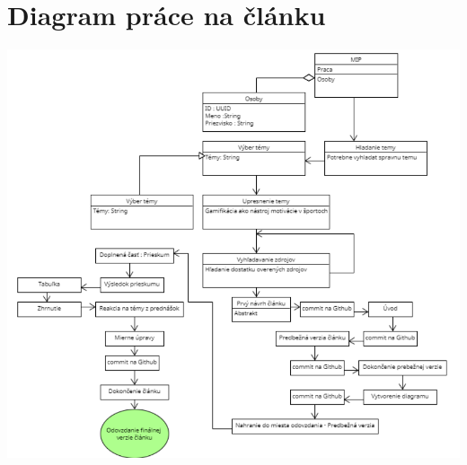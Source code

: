 \documentclass[10pt,twoside,slovak,a4paper]{article}
\begin{document}
\section{Diagram práce na článku}
\includegraphics[scale =0.7]{diagram.png}
\newpage


\end{document}
